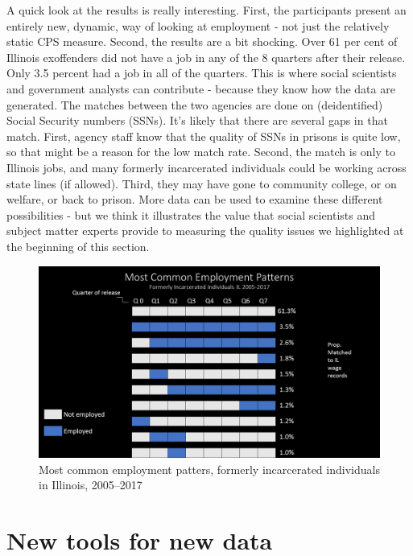 \documentclass[]{krantz}
\begin{document}
A quick look at the results is really interesting. First, the
participants present an entirely new, dynamic, way of looking at
employment - not just the relatively static CPS measure. Second, the
results are a bit shocking. Over 61 per cent of Illinois exoffenders did
not have a job in any of the 8 quarters after their release. Only 3.5
percent had a job in all of the quarters. This is where social
scientists and government analysts can contribute - because they know
how the data are generated. The matches between the two agencies are
done on (deidentified) Social Security numbers (SSNs). It's likely that
there are several gaps in that match. First, agency staff know that the
quality of SSNs in prisons is quite low, so that might be a reason for
the low match rate. Second, the match is only to Illinois jobs, and many
formerly incarcerated individuals could be working across state lines
(if allowed). Third, they may have gone to community college, or on
welfare, or back to prison. More data can be used to examine these
different possibilities - but we think it illustrates the value that
social scientists and subject matter experts provide to measuring the
quality issues we highlighted at the beginning of this section.

\begin{figure}

{\centering \includegraphics[width=0.9\linewidth]{ChapterIntro/figures/patterns} 

}

\caption{Most common employment patters, formerly incarcerated individuals in Illinois, 2005--2017}\label{fig:patternfig}
\end{figure}

\hypertarget{sec:1-5}{\section{New tools for new data}\label{sec:1-5}}
\end{document}
